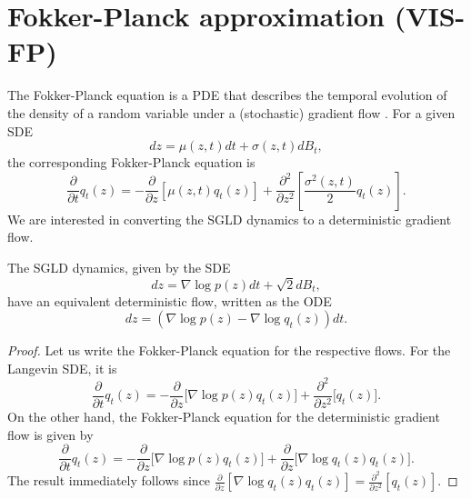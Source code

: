 \section{Fokker-Planck approximation (VIS-FP)}\label{app:fp}
  
  The Fokker-Planck equation is a PDE that describes the temporal evolution of the density of a random variable under a (stochastic) gradient flow \cite{pavliotis2014stochastic}. For a given SDE
$$
dz = \mu(z,t)dt + \sigma(z,t)dB_t,
$$
the corresponding Fokker-Planck equation is
$$
\frac{\partial}{\partial t} q_t(z) = -\frac{\partial}{\partial z}\left[ \mu(z,t)q_t(z)\right] + \frac{\partial^2}{\partial z^2} \left[ \frac{\sigma^2(z,t)}{2} q_t(z) \right].
$$
We are interested in converting the SGLD dynamics to a deterministic gradient flow. %

\begin{Proposition}
The SGLD dynamics, given by the SDE
$$
dz = \nabla \log p(z)dt + \sqrt{2}dB_t,
$$
have an equivalent deterministic flow, written as the ODE
$$
dz = (\nabla \log p(z) - \nabla \log q_t (z))dt.
$$
\end{Proposition}
\begin{proof}
Let us write the Fokker-Planck equation for the respective flows. For the Langevin SDE, it is 
$$
\frac{\partial}{\partial t} q_t(z) = - \frac{\partial}{\partial z} \bigg[ \nabla \log p(z) q_t(z) \bigg] + \frac{\partial^2}{\partial z^2} \bigg[ q_t(z) \bigg].
$$
On the other hand, the Fokker-Planck equation for the deterministic gradient flow is given by
$$
\frac{\partial}{\partial t} q_t(z) = - \frac{\partial}{\partial z} \bigg[ \nabla \log p(z) q_t(z)\bigg] + \frac{\partial}{\partial z} \bigg[ \nabla \log q_t(z) q_t(z)\bigg].
$$
The result immediately follows since $ \frac{\partial}{\partial z} \left[ \nabla \log q_t(z) q_t(z)\right] = \frac{\partial^2}{\partial z^2} \left[ q_t(z) \right]$.
\end{proof}

